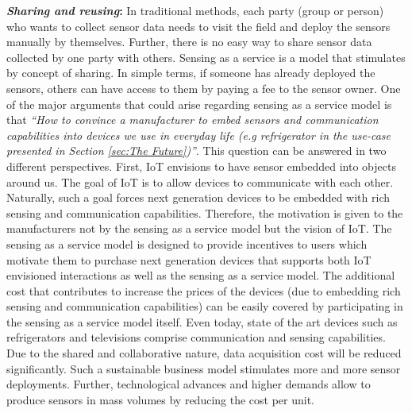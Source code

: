\documentclass[conference]{IEEEtran}
\begin{document}
\textbf{\textit{Sharing and reusing}:} In traditional methods, each party (group or person) who wants to collect sensor data needs to visit the field and deploy the sensors manually by themselves. Further, there is no easy way to share  sensor data collected by one party with others. Sensing as a service is a model that stimulates by concept of sharing. In simple terms, if someone has already deployed the sensors, others can have access to them by paying a fee to the sensor owner. One of the major arguments that could arise regarding sensing as a service model is that \textit{``How to convince a manufacturer to embed sensors and communication capabilities into devices we use in everyday life (e.g refrigerator in the use-case presented in Section \ref{sec:The Future})''}. This question can be answered in two different perspectives.  First, IoT envisions to have sensor embedded into objects around us. The goal of IoT is to allow devices to communicate with each other. Naturally, such a goal forces next generation devices to be embedded with rich sensing and communication capabilities. Therefore, the motivation is given to the manufacturers not by the sensing as a service model but the vision of IoT.  The sensing as a service model is designed to provide incentives to users which motivate them to purchase next generation devices that supports both IoT envisioned interactions as well as the sensing as a service model. The additional cost that contributes to increase the prices of the devices (due to embedding rich sensing and communication capabilities) can be easily covered by participating in the sensing as a service model itself. Even today, state of the art devices such as refrigerators and televisions comprise communication and sensing capabilities. Due to the shared and collaborative nature,  data acquisition cost will be reduced significantly. Such a sustainable business model stimulates more and more sensor deployments. Further, technological advances and higher demands allow to produce sensors in mass volumes by reducing the cost per unit. 
\end{document}
